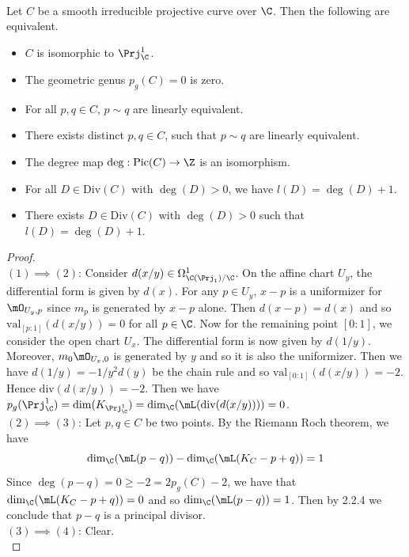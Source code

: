 \documentclass[a4paper]{article}
\begin{document}
\begin{prp}{}{}\\
Let $C$ be a smooth irreducible projective curve over $\C$. Then the following are equivalent. 
\begin{itemize}
\item $C$ is isomorphic to $\Prj_\C^1$. 
\item The geometric genus $p_g(C)=0$ is zero. 
\item For all $p,q\in C$, $p\sim q$ are linearly equivalent. 
\item There exists distinct $p,q\in C$, such that $p\sim q$ are linearly equivalent. 
\item The degree map $\deg:\text{Pic}(C)\to\Z$ is an isomorphism. 
\item For all $D\in\text{Div}(C)$ with $\deg(D)>0$, we have $l(D)=\deg(D)+1$. 
\item There exists $D\in\text{Div}(C)$ with $\deg(D)>0$ such that $l(D)=\deg(D)+1$. 
\end{itemize}
\begin{proof}\\
$(1)\implies(2)$: Consider $d(x/y)\in\Omega_{\C(\Prj_1)/\C}^1$. On the affine chart $U_y$, the differential form is given by $d(x)$. For any $p\in U_y$, $x-p$ is a uniformizer for $\mO_{U_y,p}$ since $m_p$ is generated by $x-p$ alone. Then $d(x-p)=d(x)$ and so $\text{val}_{[p:1]}(d(x/y))=0$ for all $p\in\C$. Now for the remaining point $[0:1]$, we consider the open chart $U_x$. The differential form is now given by $d(1/y)$. Moreover, $m_0\mO_{U_x,0}$ is generated by $y$ and so it is also the uniformizer. Then we have $d(1/y)=-1/y^2d(y)$ be the chain rule and so $\text{val}_{[0:1]}(d(x/y))=-2$. Hence $\text{div}(d(x/y))=-2$. Then we have $p_g(\Prj_\C^1)=\dim(K_{\Prj_\C^1})=\dim_\C(\mL(\text{div}(d(x/y))))=0$. \\

$(2)\implies(3)$: Let $p,q\in C$ be two points. By the Riemann Roch theorem, we have $$\dim_\C(\mL(p-q))-\dim_\C(\mL(K_C-p+q))=1$$ Since $\deg(p-q)=0\geq -2=2p_g(C)-2$, we have that $\dim_\C(\mL(K_C-p+q))=0$ and so $\dim_\C(\mL(p-q))=1$. Then by 2.2.4 we conclude that $p-q$ is a principal divisor. \\

$(3)\implies(4)$: Clear. \\


\end{proof}
\end{prp}
\end{document}

